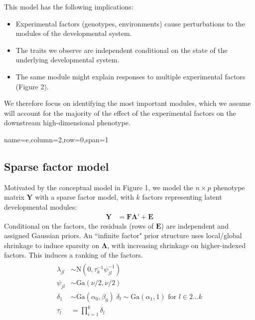 \documentclass[landscape,a0paper,fontscale=0.35]{baposter}
\begin{document}
\begin{poster}
{This model has the following implications:
\begin{itemize}
\item Experimental factors (genotypes, environments) cause perturbations to the modules of the developmental system.
\item The traits we observe are independent conditional on the state of the underlying developmental system.
\item The same module might explain responses to multiple experimental factors (Figure 2).
\end{itemize}

We therefore focus on identifying the most important modules, which we assume will account for the majority of the effect of the experimental factors on the downstream high-dimensional phenotype. 
}
 {name=e,column=2,row=0,span=1}{
\subsection{Sparse factor model}
Motivated by the conceptual model in Figure 1, we model the $n \times p$ phenotype matrix $\mathbf{Y}$ with a sparse factor model, with $k$ factors representing latent developmental modules:
\begin{align}
\mathbf{Y} &= \mathbf{F}\mathbf{\Lambda}' + \mathbf{E}
\end{align}
Conditional on the factors, the residuals (rows of $\mathbf{E}$) are independent and assigned Gaussian priors.
An ``infinite factor"\citep{Bhattacharya:2011gh} prior structure uses local/global shrinkage to induce sparsity on $\mathbf{\Lambda}$, with increasing shrinkage on higher-indexed factors. This induces a ranking of the factors.
\begin{align}\begin{split}
\lambda_{jl} &\sim \mbox{N}(0,\tau^{-1}_k \psi^{-1}_{jl}) \\
\psi_{jl} &\sim \mbox{Ga}(\nu/2,\nu/2) \\
\delta_1 &\sim \mbox{Ga}(\alpha_0,\beta_0)\; \delta_l \sim \mbox{Ga}(\alpha_1,1) \mbox{ for } l \in {2\dots k} \\
\tau_l &= \prod_{i=1}^k \delta_l
\end{split}\end{align}

}
\end{poster}
\end{document}
